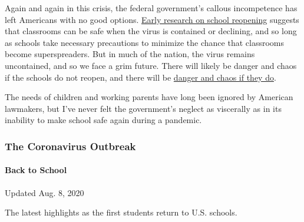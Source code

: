 Again and again in this crisis, the federal government's callous
incompetence has left Americans with no good options.
\href{https://www.sciencemag.org/news/2020/07/school-openings-across-globe-suggest-ways-keep-coronavirus-bay-despite-outbreaks}{Early
research on school reopening} suggests that classrooms can be safe when
the virus is contained or declining, and so long as schools take
necessary precautions to minimize the chance that classrooms become
superspreaders. But in much of the nation, the virus remains
uncontained, and so we face a grim future. There will likely be danger
and chaos if the schools do not reopen, and there will be
\href{https://www.nytimes.com/2020/07/10/us/politics/trump-schools-reopening.html?searchResultPosition=1}{danger
and chaos if they do}.

The needs of children and working parents have long been ignored by
American lawmakers, but I've never felt the government's neglect as
viscerally as in its inability to make school safe again during a
pandemic.

\hypertarget{the-coronavirus-outbreak}{%
\subsubsection{The Coronavirus
Outbreak}\label{the-coronavirus-outbreak}}

\hypertarget{back-to-school}{%
\paragraph{Back to School}\label{back-to-school}}

Updated Aug. 8, 2020

The latest highlights as the first students return to U.S. schools.

